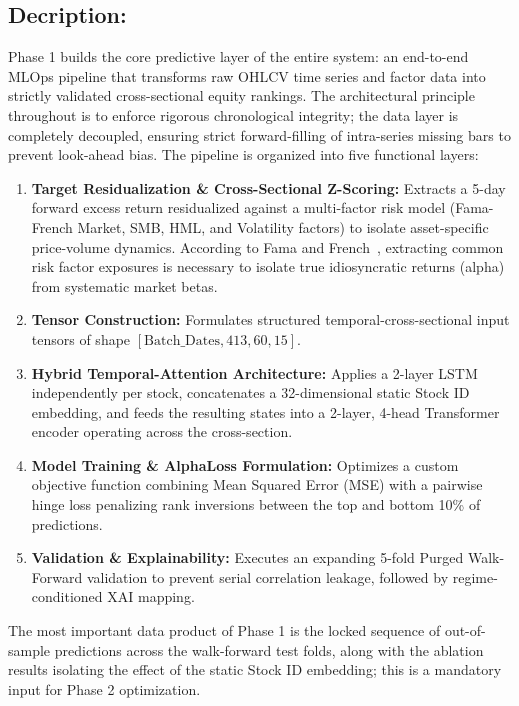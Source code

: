 \subsection*{Decription:}
Phase 1 builds the core predictive layer of the entire system: an end-to-end \acs{MLOps} pipeline that transforms raw \acs{OHLCV} time series and factor data into strictly validated cross-sectional equity rankings. The architectural principle throughout is to enforce rigorous chronological integrity; the data layer is completely decoupled, ensuring strict forward-filling of intra-series missing bars to prevent look-ahead bias. The pipeline is organized into five functional layers:
\begin{enumerate}
    \item \textbf{Target Residualization \& Cross-Sectional Z-Scoring:} Extracts a 5-day forward excess return residualized against a multi-factor risk model (Fama-French Market, SMB, HML, and Volatility factors) to isolate asset-specific price-volume dynamics. According to Fama and French~\cite{FamaFrench1993}, extracting common risk factor exposures is necessary to isolate true idiosyncratic returns (alpha) from systematic market betas.
    \item \textbf{Tensor Construction:} Formulates structured temporal-cross-sectional input tensors of shape $[\text{Batch\_Dates}, 413, 60, 15]$.
    \item \textbf{Hybrid Temporal-Attention Architecture:} Applies a 2-layer LSTM independently per stock, concatenates a 32-dimensional static Stock ID embedding, and feeds the resulting states into a 2-layer, 4-head Transformer encoder operating across the cross-section.
    \item \textbf{Model Training \& AlphaLoss Formulation:} Optimizes a custom objective function combining Mean Squared Error (MSE) with a pairwise hinge loss penalizing rank inversions between the top and bottom 10\% of predictions.
    \item \textbf{Validation \& Explainability:} Executes an expanding 5-fold Purged Walk-Forward validation to prevent serial correlation leakage, followed by regime-conditioned \ac{XAI} mapping.
\end{enumerate}

The most important data product of Phase 1 is the locked sequence of out-of-sample predictions across the walk-forward test folds, along with the ablation results isolating the effect of the static Stock ID embedding; this is a mandatory input for Phase 2 optimization.

